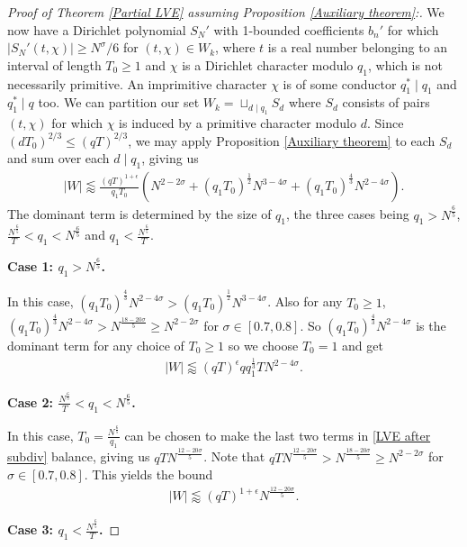 \documentclass[12pt]{amsart}
\theoremstyle{definition}
\theoremstyle{plain}
\theoremstyle{remark}
\numberwithin{equation}{section}
\numberwithin{theorem}{section}
\numberwithin{equation}{section}
\begin{document}
\begin{proof}[Proof of Theorem \ref{Partial LVE} assuming Proposition \ref{Auxiliary theorem}:]
		We now have a Dirichlet polynomial $S_N'$ with 1-bounded coefficients $b_n'$ for which $|S_N'(t,\chi)|\geq N^{\sigma}/6$ for $(t,\chi) \in W_k$, where $t$ is a real number belonging to an interval of length $T_0\geq1$ and $\chi$ is a Dirichlet character modulo $q_1$, which is not necessarily primitive. An imprimitive character $\chi$ is of some conductor $q_1^* \mid q_1$ and $q_1^* \mid q$ too. We can partition our set $W_k = \sqcup_{d \mid q_1} S_d$ where $S_d$ consists of pairs $(t,\chi)$ for which $\chi$ is induced by a primitive character modulo $d$. Since $(dT_0)^{2/3} \leq (qT)^{2/3}$, we may apply Proposition \ref{Auxiliary theorem} to each $S_d$ and sum over each $d \mid q_1$, giving us
		\begin{align}
			|W| \lessapprox \frac{(qT)^{1+\epsilon}}{q_1T_0}(N^{2-2\sigma}+(q_1T_0)^{\frac{1}{2}}N^{3-4\sigma} +   (q_1T_0)^{\frac{4}{3}}N^{2-4\sigma}). \label{LVE after subdiv}
		\end{align}
		The dominant term is determined by the size of $q_1$, the three cases being $q_1 > N^{\frac{6}{5}}$, $\frac{N^{\frac{6}{5}}}{T} < q_1 < N^{\frac{6}{5}}$ and $q_1 < \frac{N^{\frac{6}{5}}}{T}$.
		
		\textbf{Case 1: $q_1 > N^{\frac{6}{5}}$.} 
		
		In this case, $(q_1T_0)^{\frac{4}{3}}N^{2-4\sigma}>(q_1T_0)^{\frac{1}{2}}N^{3-4\sigma}$. Also for any $T_0 \geq 1$, $(q_1T_0)^{\frac{4}{3}}N^{2-4\sigma} > N^{\frac{18-20\sigma}{5}} \geq N^{2-2\sigma}$ for $\sigma \in [0.7,0.8
		]$. So $(q_1T_0)^{\frac{4}{3}}N^{2-4\sigma}$ is the dominant term for any choice of $T_0\geq 1$ so we choose $T_0=1$ and get
		\begin{align*}
			|W| \lessapprox (qT)^{\epsilon} qq_1^{\frac{1}{3}}T N^{2-4\sigma}.
		\end{align*}
		
		\textbf{Case 2: $\frac{N^{\frac{6}{5}}}{T}<q_1 < N^{\frac{6}{5}}$.} 
		
		In this case, $T_0 = \frac{N^{\frac{6}{5}}}{q_1}$ can be chosen to make the last two terms in \eqref{LVE after subdiv} balance, giving us $qTN^{\frac{12-20\sigma}{5}}$.  Note that $qTN^{\frac{12-20\sigma}{5}} > N^{\frac{18-20\sigma}{5}} \geq N^{2-2\sigma}$ for $\sigma \in [0.7,0.8]$. This yields the bound
		\begin{align*}
			|W| \lessapprox (qT)^{1+\epsilon}N^{\frac{12-20\sigma}{5}}.
		\end{align*}
		
		\textbf{Case 3: $q_1 < \frac{N^{\frac{6}{5}}}{T}$.} 
		

\end{proof}
\end{document}
